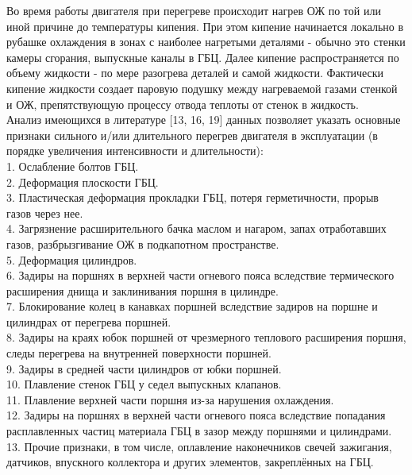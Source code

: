 Во время работы двигателя при перегреве происходит нагрев ОЖ по той или иной причине до температуры кипения. При этом кипение начинается локально в рубашке охлаждения в зонах с наиболее нагретыми деталями - обычно это стенки камеры сгорания, выпускные каналы в ГБЦ. Далее кипение распространяется по объему жидкости - по мере разогрева деталей и самой жидкости. Фактически кипение жидкости создает паровую подушку между нагреваемой газами стенкой и ОЖ, препятствующую процессу отвода теплоты от стенок в жидкость.\\
Анализ имеющихся в литературе [13, 16, 19] данных позволяет указать основные признаки сильного и/или длительного перегрев двигателя в эксплуатации (в порядке увеличения интенсивности и длительности):\\
1.	Ослабление болтов ГБЦ.\\
2.	Деформация плоскости ГБЦ.\\
3.	Пластическая деформация прокладки ГБЦ, потеря герметичности, прорыв газов через нее.\\
4.	Загрязнение расширительного бачка маслом и нагаром, запах отработавших газов, разбрызгивание ОЖ в подкапотном пространстве.\\
5.	Деформация цилиндров.\\
6.	Задиры на поршнях в верхней части огневого пояса вследствие термического расширения днища и заклинивания поршня в цилиндре.\\
7.	Блокирование колец в канавках поршней вследствие задиров на поршне и цилиндрах от перегрева поршней.\\
8.	Задиры на краях юбок поршней от чрезмерного теплового расширения поршня, следы перегрева на внутренней поверхности поршней.\\
9.	Задиры в средней части цилиндров от юбки поршней.\\
10.	Плавление стенок ГБЦ у седел выпускных клапанов.\\
11.	Плавление верхней части поршня из-за нарушения охлаждения.\\
12.	Задиры на поршнях в верхней части огневого пояса вследствие попадания расплавленных частиц материала ГБЦ в зазор между поршнями и цилиндрами.\\
13.	Прочие признаки, в том числе, оплавление наконечников свечей зажигания, датчиков, впускного коллектора и других элементов, закреплённых на ГБЦ.\\


